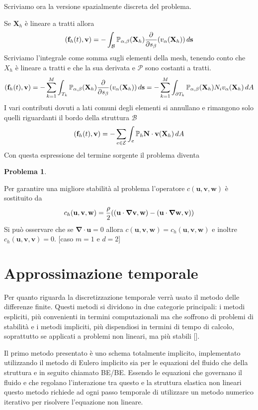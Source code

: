 \documentclass{book}
\newtheorem{problem}[theorem]{Problema}
\newcommand{\Nabla}{\boldsymbol{\nabla}}
\begin{document}
Scriviamo ora la versione spazialmente discreta del problema.

Se $\mathbf{X}_h$ è lineare a tratti allora 
$$\ps{\mathbf{f}_h(t)}{\mathbf{v}}=-\int_{\mathcal{B}}\mathbb{P}_{\alpha,\beta}(\mathbf{X}_h)\frac{\partial}{\partial s_\beta}(v_\alpha(\mathbf{X}_h))\, d\mathbf{s}$$
Scriviamo l'integrale come somma sugli elementi della mesh, tenendo conto che $X_h$ è lineare a tratti e che la sua derivata e $\mathcal{P}$ sono costanti a tratti.
$$\ps{\mathbf{f}_h(t)}{\mathbf{v}}=-\sum^M_{k=1}\int_{T_k}\mathbb{P}_{\alpha,\beta}(\mathbf{X}_h)\frac{\partial}{\partial s_\beta}(v_\alpha(\mathbf{X}_h))\, d\mathbf{s}
    =-\sum^M_{k=1}\int_{\partial T_k}\mathbb{P}_{\alpha,\beta}(\mathbf{X}_h)N_i v_\alpha(\mathbf{X}_h)\, dA$$
I vari contributi dovuti a lati comuni degli elementi si annullano e rimangono solo quelli riguardanti il bordo della struttura $\mathcal{B}$
$$\ps{\mathbf{f}_h(t)}{\mathbf{v}}=-\sum_{e\in\mathcal{E}}\int_e\mathbb{P}_h\mathbf{N}\cdot\mathbf{v}(\mathbf{X}_h)\,dA$$
Con questa espressione del termine sorgente il problema diventa
\begin{problem}
\end{problem}
Per garantire una migliore stabilità al problema l'operatore $c(\mathbf{u},\mathbf{v},\mathbf{w})$ è sostituito da
$$c_h(\mathbf{u},\mathbf{v},\mathbf{w})=\frac{\rho}{2}(\ps{\mathbf{u}\cdot\Nabla\mathbf{v}}{\mathbf{w}}-\ps{\mathbf{u}\cdot\Nabla\mathbf{w}}{\mathbf{v}})$$
Si può osservare che se $\Nabla\cdot\mathbf{u}=0$ allora $c(\mathbf{u},\mathbf{v},\mathbf{w})=c_h(\mathbf{u},\mathbf{v},\mathbf{w})$ e inoltre $c_h(\mathbf{u},\mathbf{v},\mathbf{v})=0$.
[caso $m=1$ e $d=2$]

\section{Approssimazione temporale}

Per quanto riguarda la discretizzazione temporale verrà usato il metodo delle differenze finite. Questi metodi si dividono in due categorie principali: i metodi espliciti, più convenienti in termini computazionali ma che soffrono di problemi di stabilità e i metodi impliciti, più dispendiosi in termini di tempo di calcolo, soprattutto se applicati a problemi non lineari, ma più stabili [].

Il primo metodo presentato è uno schema totalmente implicito, implementato utilizzando il metodo di Eulero implicito sia per le equazioni del fluido che della struttura e in seguito chiamato BE/BE. Essendo le equazioni che governano il fluido e che regolano l'interazione tra questo e la struttura elastica non lineari questo metodo richiede ad ogni passo temporale di utilizzare un metodo numerico iterativo per risolvere l'equazione non lineare.
\end{document}
